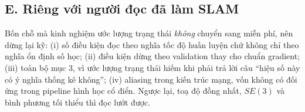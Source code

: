 \documentclass[../../deep_learning.tex]{subfiles}
\begin{document}
\subsection*{E. Riêng với người đọc đã làm SLAM}
Bốn chỗ mà kinh nghiệm ước lượng trạng thái \emph{không} chuyển sang miễn phí, nên dừng lại kỹ: (i) số điều kiện đọc theo nghĩa tốc độ huấn luyện chứ không chỉ theo nghĩa ổn định số học; (ii) điều kiện dừng theo validation thay cho chuẩn gradient; (iii) toàn bộ mục 3, vì ước lượng trạng thái hiếm khi phải trả lời câu ``hiệu số này có ý nghĩa thống kê không''; (iv) aliasing trong kiến trúc mạng, vốn không có đối ứng trong pipeline hình học cổ điển. Ngược lại, toạ độ đồng nhất, \(SE(3)\) và bình phương tối thiểu thì đọc lướt được.
\end{document}
